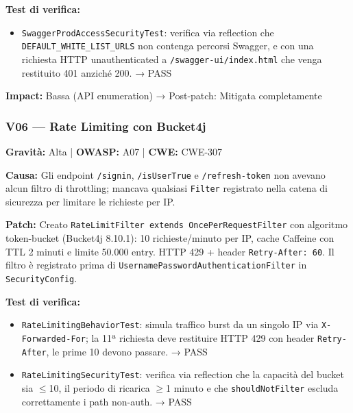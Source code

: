 \documentclass[12pt, a4paper]{article}
\begin{document}
    \textbf{Test di verifica:}
    \begin{itemize}
        \item \texttt{SwaggerProdAccessSecurityTest}: verifica via reflection che
        \texttt{DEFAULT\_WHITE\_LIST\_URLS} non contenga percorsi Swagger, e con una richiesta
        HTTP unauthenticated a \texttt{/swagger-ui/index.html} che venga restituito 401
        anziché 200. → \checkmark{} PASS
    \end{itemize}

    \textbf{Impact:} Bassa (API enumeration) → Post-patch: Mitigata completamente

    \subsubsection{V06 — Rate Limiting con Bucket4j}

    \textbf{Gravità:} Alta | \textbf{OWASP:} A07 | \textbf{CWE:} CWE-307

    \textbf{Causa:} Gli endpoint \texttt{/signin}, \texttt{/isUserTrue} e
    \texttt{/refresh-token} non avevano alcun filtro di throttling; mancava qualsiasi
    \texttt{Filter} registrato nella catena di sicurezza per limitare le richieste per IP.

    \textbf{Patch:} Creato \texttt{RateLimitFilter extends OncePerRequestFilter} con
    algoritmo token-bucket (Bucket4j 8.10.1): 10 richieste/minuto per IP, cache Caffeine
    con TTL 2 minuti e limite 50.000 entry. HTTP 429 + header \texttt{Retry-After: 60}.
    Il filtro è registrato prima di \texttt{UsernamePasswordAuthenticationFilter} in \texttt{SecurityConfig}.

    \textbf{Test di verifica:}
    \begin{itemize}
        \item \texttt{RateLimitingBehaviorTest}: simula traffico burst da un singolo IP via
        \texttt{X-Forwarded-For}; la 11ª richiesta deve restituire HTTP 429 con header
        \texttt{Retry-After}, le prime 10 devono passare. → \checkmark{} PASS
        \item \texttt{RateLimitingSecurityTest}: verifica via reflection che la capacità del
        bucket sia $\leq$10, il periodo di ricarica $\geq$1 minuto e che \texttt{shouldNotFilter}
        escluda correttamente i path non-auth. → \checkmark{} PASS
    \end{itemize}
\end{document}
